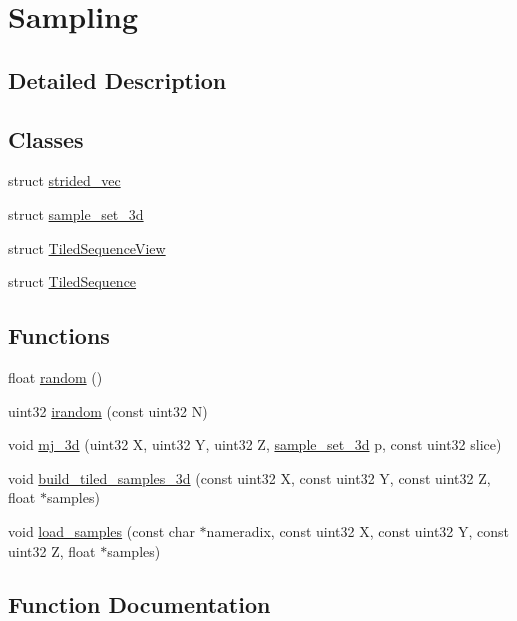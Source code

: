 \hypertarget{group___sampling}{}\section{Sampling}
\label{group___sampling}


\subsection{Detailed Description}
\subsection*{Classes}
\begin{DoxyCompactItemize}
\item 
struct \hyperlink{structstrided__vec}{strided\+\_\+vec}
\item 
struct \hyperlink{structsample__set__3d}{sample\+\_\+set\+\_\+3d}
\item 
struct \hyperlink{struct_tiled_sequence_view}{Tiled\+Sequence\+View}
\item 
struct \hyperlink{struct_tiled_sequence}{Tiled\+Sequence}
\end{DoxyCompactItemize}
\subsection*{Functions}
\begin{DoxyCompactItemize}
\item 
float \hyperlink{group___sampling_gaec17bbbfd36295353081b7b4480d933d}{random} ()
\item 
uint32 \hyperlink{group___sampling_ga60d3362a11c556fce4eaf7e9989b119a}{irandom} (const uint32 N)
\item 
void \hyperlink{group___sampling_ga74a2d233874c14c777b4a1f7de6dcad7}{mj\+\_\+3d} (uint32 X, uint32 Y, uint32 Z, \hyperlink{structsample__set__3d}{sample\+\_\+set\+\_\+3d} p, const uint32 slice)
\item 
void \hyperlink{group___sampling_gaab55fcc60947be784a6023b83b155ad1}{build\+\_\+tiled\+\_\+samples\+\_\+3d} (const uint32 X, const uint32 Y, const uint32 Z, float $\ast$samples)
\item 
void \hyperlink{group___sampling_gac2c10d84fc3ae4eab94ebad2c1e72e99}{load\+\_\+samples} (const char $\ast$nameradix, const uint32 X, const uint32 Y, const uint32 Z, float $\ast$samples)
\end{DoxyCompactItemize}


\subsection{Function Documentation}
\mbox{\label{group___sampling_gaab55fcc60947be784a6023b83b155ad1}} 
